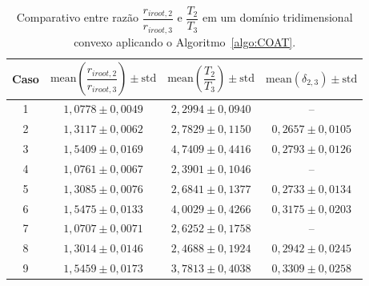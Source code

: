 \begin{table}[!htb]
  \centering
  \captiondelim{: }
  \caption{Comparativo entre razão $\dfrac{r_{iroot, 2}}{r_{iroot, 3}}$ e $\dfrac{T_2}{T_3}$ 
  em um domínio tridimensional convexo aplicando o Algoritmo~\ref{algo:COAT}.}
\begin{tabular}{|c|c|c|c|}
\hline
Caso & $\textrm{mean}\left(\dfrac{r_{iroot, 2}}{r_{iroot, 3}}\right)\pm \textrm{std}$ & $\textrm{mean}\left(\dfrac{T_2}{T_3}\right) \pm \textrm{std}$ & $\textrm{mean}\left(\delta_{2,3}\right) \pm \textrm{std}$ \\ \hline
1 & $1,0778 \pm 0,0049$ & $2,2994 \pm 0,0940$ & -- \\ \hline
2 & $1,3117 \pm 0,0062$ & $2,7829 \pm 0,1150$ & $0,2657 \pm 0,0105$ \\ \hline
3 & $1,5409 \pm 0,0169$ & $4,7409 \pm 0,4416$ & $0,2793 \pm 0,0126$ \\ \hline
4 & $1,0761 \pm 0,0067$ & $2,3901 \pm 0,1046$ & -- \\ \hline
5 & $1,3085 \pm 0,0076$ & $2,6841 \pm 0,1377$ & $0,2733 \pm 0,0134$ \\ \hline
6 & $1,5475 \pm 0,0133$ & $4,0029 \pm 0,4266$ & $0,3175 \pm 0,0203$ \\ \hline
7 & $1,0707 \pm 0,0071$ & $2,6252 \pm 0,1758$ & -- \\ \hline
8 & $1,3014 \pm 0,0146$ & $2,4688 \pm 0,1924$ & $0,2942 \pm 0,0245$ \\ \hline
9 & $1,5459 \pm 0,0173$ & $3,7813 \pm 0,4038$ & $0,3309 \pm 0,0258$ \\ \hline
\end{tabular}
  \label{tab:resultados-lei-alometrica-floresta-coat-3arvores-3d-parte3}
\end{table}

\clearpage

